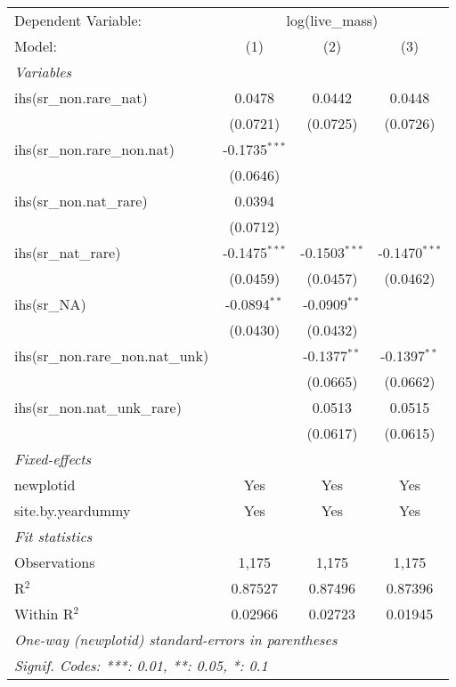 \begin{tabular}{lccc}
\tabularnewline\midrule\midrule
Dependent Variable:&\multicolumn{3}{c}{log(live\_mass)}\\
Model:&(1) & (2) & (3)\\
\midrule \emph{Variables}&   &   &  \\
ihs(sr\_non.rare\_nat)&0.0478 & 0.0442 & 0.0448\\
  &(0.0721) & (0.0725) & (0.0726)\\
ihs(sr\_non.rare\_non.nat)&-0.1735$^{***}$ &    &   \\
  &(0.0646) &    &   \\
ihs(sr\_non.nat\_rare)&0.0394 &    &   \\
  &(0.0712) &    &   \\
ihs(sr\_nat\_rare)&-0.1475$^{***}$ & -0.1503$^{***}$ & -0.1470$^{***}$\\
  &(0.0459) & (0.0457) & (0.0462)\\
ihs(sr\_NA)&-0.0894$^{**}$ & -0.0909$^{**}$ &   \\
  &(0.0430) & (0.0432) &   \\
ihs(sr\_non.rare\_non.nat\_unk)&   & -0.1377$^{**}$ & -0.1397$^{**}$\\
  &   & (0.0665) & (0.0662)\\
ihs(sr\_non.nat\_unk\_rare)&   & 0.0513 & 0.0515\\
  &   & (0.0617) & (0.0615)\\
\midrule \emph{Fixed-effects}&   &   &  \\
newplotid & Yes & Yes & Yes\\
site.by.yeardummy & Yes & Yes & Yes\\
\midrule \emph{Fit statistics}&  & & \\
Observations & 1,175&1,175&1,175\\
R$^2$ & 0.87527&0.87496&0.87396\\
Within R$^2$ & 0.02966&0.02723&0.01945\\
\midrule\midrule\multicolumn{4}{l}{\emph{One-way (newplotid) standard-errors in parentheses}}\\
\multicolumn{4}{l}{\emph{Signif. Codes: ***: 0.01, **: 0.05, *: 0.1}}\\
\end{tabular}


